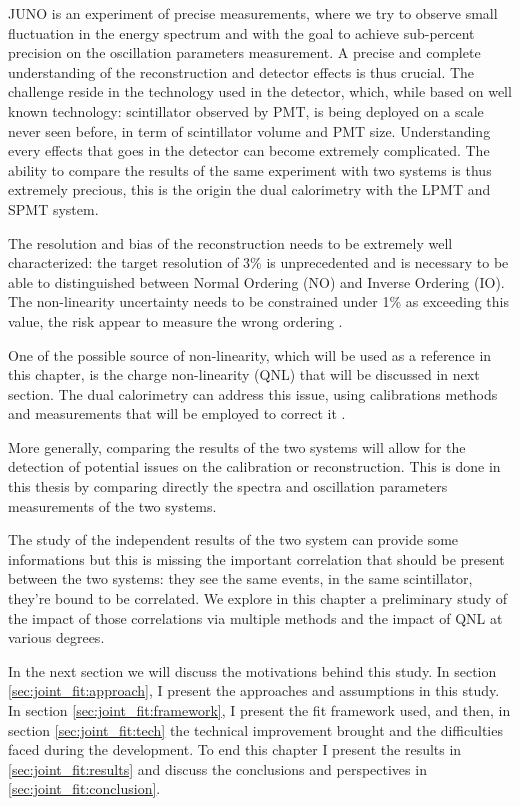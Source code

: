 \documentclass[../main.tex]{subfiles}
\begin{document}
JUNO is an experiment of precise measurements, where we try to observe small fluctuation in the energy spectrum and with the goal to achieve sub-percent precision on the oscillation parameters measurement.
A precise and complete understanding of the reconstruction and detector effects is thus crucial.
The challenge reside in the technology used in the detector, which, while based on well known technology: scintillator observed by PMT, is being deployed on a scale never seen before, in term of scintillator volume and  PMT size. Understanding every effects that goes in the detector can become extremely complicated. The ability to compare the results of the same experiment with two systems is thus extremely precious, this is the origin the dual calorimetry with the LPMT and SPMT system.

The resolution and bias of the reconstruction needs to be extremely well characterized: the target resolution of 3\% \cite{juno_collaboration_juno_2022} is unprecedented and is necessary to be able to distinguished between Normal Ordering (NO) and Inverse Ordering (IO). The non-linearity uncertainty needs to be constrained under 1\% as exceeding this value, the risk appear to measure the wrong ordering \cite{han_dual_2021}.

One of the possible source of non-linearity, which will be used as a reference in this chapter, is the charge non-linearity (QNL) that will be discussed in next section. The dual calorimetry can address this issue, using calibrations methods and measurements that will be employed to correct it \cite{han_dual_2021}.

More generally, comparing the results of the two systems will allow for the detection of potential issues on the calibration or reconstruction. This is done in this thesis by comparing directly the spectra and oscillation parameters measurements of the two systems.

The study of the independent results of the two system can provide some informations \cite{cabrera_multi-calorimetry_2023} but this is missing the important correlation that should be present between the two systems: they see the same events, in the same scintillator, they're bound to be correlated. We explore in this chapter a preliminary study of the impact of those correlations via multiple methods and the impact of QNL at various degrees.

In the next section we will discuss the motivations behind this study. In section \ref{sec:joint_fit:approach}, I present the approaches and assumptions in this study. In section \ref{sec:joint_fit:framework}, I present the fit framework used, and then, in section \ref{sec:joint_fit:tech} the technical improvement brought and the difficulties faced during the development. To end this chapter I present the results in \ref{sec:joint_fit:results} and discuss the conclusions and perspectives in \ref{sec:joint_fit:conclusion}.
\end{document}

